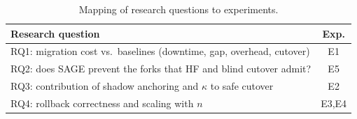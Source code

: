 \documentclass[journal]{IEEEtran}
\theoremstyle{definition}
\theoremstyle{remark}
\begin{document}
\begin{table}[t]
\centering
\caption{Mapping of research questions to experiments.}
\label{tab:rqmap}
\renewcommand{\arraystretch}{1.12}
\footnotesize
\begin{tabular}{p{}c}
\toprule
Research question & Exp. \\
\midrule
RQ1: migration cost vs.\ baselines (downtime, gap, overhead, cutover) & E1 \\
RQ2: does SAGE prevent the forks that HF and blind cutover admit? & E5 \\
RQ3: contribution of shadow anchoring and $\kappa$ to safe cutover & E2 \\
RQ4: rollback correctness and scaling with $n$ & E3,E4 \\
\bottomrule
\end{tabular}
\end{table}
\end{document}
